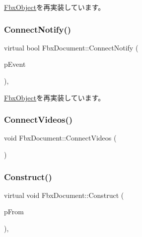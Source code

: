 \hyperlink{class_fbx_object_a2720f16a08150d162242b0c59f58c3dc}{Fbx\+Object}を再実装しています。

\mbox{\label{class_fbx_document_a7c3b910b2d44729973266e32733da3fb}} 
\subsubsection{\texorpdfstring{Connect\+Notify()}{ConnectNotify()}}
{\footnotesize\ttfamily virtual bool Fbx\+Document\+::\+Connect\+Notify (\begin{DoxyParamCaption}\item[{const \hyperlink{class_fbx_connect_event}{Fbx\+Connect\+Event} \&}]{p\+Event }\end{DoxyParamCaption})\hspace{0.3cm}{\ttfamily [protected]}, {\ttfamily [virtual]}}



\hyperlink{class_fbx_object_ab7a400f3829d1f0da57d3d78c8168dd0}{Fbx\+Object}を再実装しています。

\mbox{\label{class_fbx_document_a1d4dc5bd8518bd2e37f1b13aa950350f}} 
\subsubsection{\texorpdfstring{Connect\+Videos()}{ConnectVideos()}}
{\footnotesize\ttfamily void Fbx\+Document\+::\+Connect\+Videos (\begin{DoxyParamCaption}{ }\end{DoxyParamCaption})}

\mbox{\label{class_fbx_document_a9bc37787619a99fca90b839c16e4f2b8}} 
\subsubsection{\texorpdfstring{Construct()}{Construct()}}
{\footnotesize\ttfamily virtual void Fbx\+Document\+::\+Construct (\begin{DoxyParamCaption}\item[{const \hyperlink{class_fbx_object}{Fbx\+Object} $\ast$}]{p\+From }\end{DoxyParamCaption})\hspace{0.3cm}{\ttfamily [protected]}, {\ttfamily [virtual]}}

